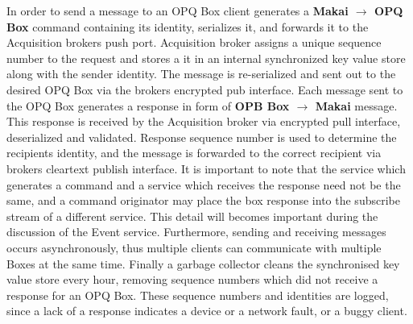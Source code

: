 In order to send a message to an OPQ Box client generates a \textbf{Makai $\rightarrow$ OPQ Box} command containing its identity, serializes it, and forwards it to the Acquisition brokers push port.
Acquisition broker assigns a unique sequence number to the request and stores a it in an internal synchronized key value store along with the sender identity.
The message is re-serialized and sent out to the desired OPQ Box via the brokers encrypted pub interface.
Each message sent to the OPQ Box generates a response in form of \textbf{OPB Box $\rightarrow$ Makai} message.
This response is received by the Acquisition broker via encrypted pull interface, deserialized and validated.
Response sequence number is used to determine the recipients identity, and the message is forwarded to the correct recipient via brokers cleartext publish interface.
It is important to note that the service which generates a command and a service which receives the response need not be the same, and a command originator may place the box response into the subscribe stream of a different service.
This detail will becomes important during the discussion of the Event service.
Furthermore, sending and receiving messages occurs asynchronously, thus multiple clients can communicate with multiple Boxes at the same time.
Finally a garbage collector cleans the synchronised key value store every hour, removing sequence numbers which did not receive a response for an OPQ Box.
These sequence numbers and identities are logged, since a lack of a response indicates a device or a network fault, or a buggy client.

